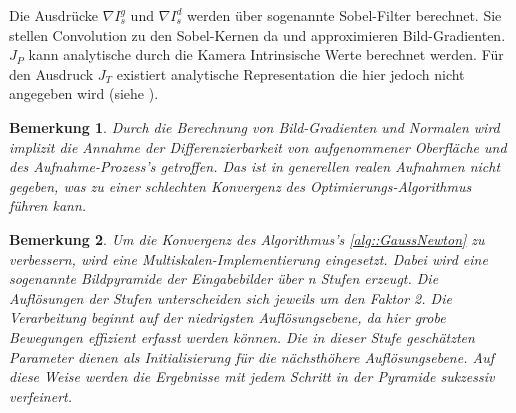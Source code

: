 \documentclass[12pt,DIV=15,BCOR=15mm,twoside,headsepline,abstract=true,listof=totoc,bibliography=totoc]{scrreprt}
\newtheorem{remark}{Bemerkung}[chapter]
\theoremstyle{remark}    %
\begin{document}
    Die Ausdrücke  $\nabla I_s^g$ und $\nabla I_s^d$ werden über sogenannte Sobel-Filter berechnet. Sie stellen Convolution zu den Sobel-Kernen da
    und approximieren Bild-Gradienten. $J_P$ kann analytische durch die Kamera Intrinsische Werte berechnet werden. Für den Ausdruck $J_T$ existiert analytische 
    Representation die hier jedoch nicht angegeben wird (siehe \cite{Forster_2017}).
    \begin{remark}\label{bem:diff}
    Durch die Berechnung von Bild-Gradienten und Normalen wird implizit die Annahme der Differenzierbarkeit von aufgenommener Oberfläche und 
    des Aufnahme-Prozess's getroffen. Das ist in generellen realen Aufnahmen nicht gegeben, was zu einer schlechten Konvergenz des Optimierungs-Algorithmus 
    führen kann.
    \end{remark}
    \begin{remark}\label{bem:multiscale}
    Um die Konvergenz des Algorithmus's \ref{alg::GaussNewton} zu verbessern, wird eine Multiskalen-Implementierung eingesetzt.
    Dabei wird eine sogenannte Bildpyramide der Eingabebilder über n Stufen erzeugt.
    Die Auflösungen der Stufen unterscheiden sich jeweils um den Faktor 2.
    Die Verarbeitung beginnt auf der niedrigsten Auflösungsebene, da hier grobe Bewegungen effizient erfasst werden können.
    Die in dieser Stufe geschätzten Parameter dienen als Initialisierung für die nächsthöhere Auflösungsebene.
    Auf diese Weise werden die Ergebnisse mit jedem Schritt in der Pyramide sukzessiv verfeinert. \cite{djema2023densevisualodometryusing}
    \end{remark}
    
\end{document}
